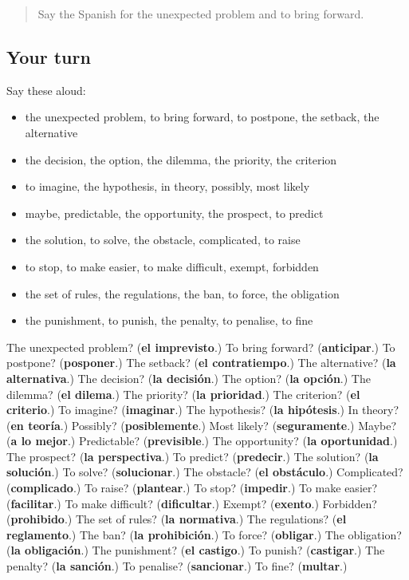 \begin{quote}
Say the Spanish for the unexpected problem and to bring forward.
\end{quote}

\subsection*{Your turn}
Say these aloud:

\begin{itemize}
\raggedright
  \item the unexpected problem, to bring forward, to postpone, the setback, the alternative
  \item the decision, the option, the dilemma, the priority, the criterion
  \item to imagine, the hypothesis, in theory, possibly, most likely
  \item maybe, predictable, the opportunity, the prospect, to predict
  \item the solution, to solve, the obstacle, complicated, to raise
  \item to stop, to make easier, to make difficult, exempt, forbidden
  \item the set of rules, the regulations, the ban, to force, the obligation
  \item the punishment, to punish, the penalty, to penalise, to fine
\end{itemize}

\begin{tcolorbox}[breakable,colback=teal!4,colframe=teal!35!black,title={Before you move on}]
The unexpected problem? (\textbf{el imprevisto}.) To bring forward? (\textbf{anticipar}.) To postpone? (\textbf{posponer}.) The setback? (\textbf{el contratiempo}.) The alternative? (\textbf{la alternativa}.) The decision? (\textbf{la decisión}.) The option? (\textbf{la opción}.) The dilemma? (\textbf{el dilema}.) The priority? (\textbf{la prioridad}.) The criterion? (\textbf{el criterio}.) To imagine? (\textbf{imaginar}.) The hypothesis? (\textbf{la hipótesis}.) In theory? (\textbf{en teoría}.) Possibly? (\textbf{posiblemente}.) Most likely? (\textbf{seguramente}.) Maybe? (\textbf{a lo mejor}.) Predictable? (\textbf{previsible}.) The opportunity? (\textbf{la oportunidad}.) The prospect? (\textbf{la perspectiva}.) To predict? (\textbf{predecir}.) The solution? (\textbf{la solución}.) To solve? (\textbf{solucionar}.) The obstacle? (\textbf{el obstáculo}.) Complicated? (\textbf{complicado}.) To raise? (\textbf{plantear}.) To stop? (\textbf{impedir}.) To make easier? (\textbf{facilitar}.) To make difficult? (\textbf{dificultar}.) Exempt? (\textbf{exento}.) Forbidden? (\textbf{prohibido}.) The set of rules? (\textbf{la normativa}.) The regulations? (\textbf{el reglamento}.) The ban? (\textbf{la prohibición}.) To force? (\textbf{obligar}.) The obligation? (\textbf{la obligación}.) The punishment? (\textbf{el castigo}.) To punish? (\textbf{castigar}.) The penalty? (\textbf{la sanción}.) To penalise? (\textbf{sancionar}.) To fine? (\textbf{multar}.)
\end{tcolorbox}
